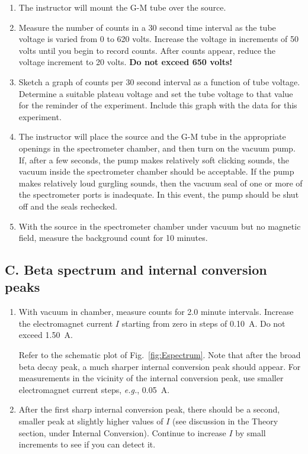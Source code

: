 \begin{enumerate}
\item The instructor will mount the G-M tube over the \cs source.

\item Measure the number of counts in a 30 second time interval as the
tube voltage is varied from 0 to 620 volts.  Increase the voltage in
increments of 50 volts until you begin to record counts.  After counts
appear, reduce the voltage increment to 20 volts. {\bf Do not exceed 650
volts!}

\item Sketch a graph of counts per 30 second interval as a function of tube
  voltage.  Determine a suitable plateau voltage and set the tube voltage to
  that value for the reminder of the experiment.  Include this graph with the
  data for this experiment.

\item The instructor will place the \cs source and the G-M tube in
the appropriate openings in the spectrometer chamber, and then turn on
the vacuum pump.  If, after a few seconds, the pump makes relatively
soft clicking sounds, the vacuum inside the spectrometer chamber should
be acceptable.  If the pump makes relatively loud gurgling sounds,
then the vacuum seal of one or more of the spectrometer ports is
inadequate.  In this event, the pump should be shut off and the seals
rechecked.

\item With the source in the spectrometer chamber under vacuum but no
magnetic field, measure the background count for 10 minutes.

\end{enumerate}

\subsection{C.  Beta spectrum and internal conversion peaks}

\begin{enumerate}

\item With vacuum in chamber, measure counts for 2.0 minute intervals.
Increase the electromagnet current $I$ starting from zero in steps of
0.10~A.  Do not exceed 1.50~A.

Refer to the schematic plot of Fig.~\ref{fig:Espectrum}.  Note that after the broad beta
decay peak, a much sharper internal conversion peak should appear.
For measurements in the vicinity of the internal conversion peak, use
smaller electromagnet current steps, {\em e.g.}, 0.05~A.

\item After the first sharp internal conversion peak, there should be a
second, smaller peak at slightly higher values of $I$ (see discussion in
the Theory section, under Internal Conversion).  Continue to increase
$I$ by small increments to see if you can detect it.

\end{enumerate}

